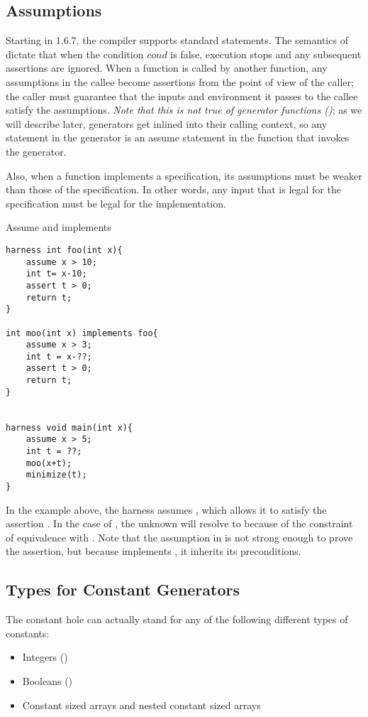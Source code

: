 \subsection{Assumptions}
Starting in \Sk{} 1.6.7, the compiler supports standard  statements. The semantics of  dictate that when the condition $cond$ is false, execution stops and any subsequent assertions are ignored. When a function is called by another function, any assumptions in the callee become assertions from the point of view of the caller; \ie{} the caller must guarantee that the inputs and environment it passes to the callee satisfy the assumptions. \emph{Note that this is not true of generator functions ()}; as we will describe later, generators get inlined into their calling context, so any  statement in the generator is an assume statement in the function that invokes the generator.

Also, when a function implements a specification, its assumptions must be weaker than those of the specification. In other words, any input that is legal for the specification must be legal for the implementation. 

\begin{Example}{Assume and implements}
\begin{lstlisting}
harness int foo(int x){
	assume x > 10;
	int t= x-10;
	assert t > 0;
	return t;
}

int moo(int x) implements foo{
	assume x > 3;
	int t = x-??;
	assert t > 0;
	return t;
}


harness void main(int x){
	assume x > 5;
	int t = ??;
	moo(x+t);
	minimize(t);
}
\end{lstlisting}
In the example above, the harness  assumes , which allows it to satisfy the assertion . In the case of , the unknown will resolve to  because of the constraint of equivalence with . Note that the assumption in  is not strong enough to prove the assertion, but because  implements , it inherits its preconditions. 
\end{Example}


\subsection{Types for Constant Generators}
The constant hole  can actually stand for any of the following different types of constants: 
\begin{itemize}
	\item Integers ()
	\item Booleans ()
	\item Constant sized arrays and nested constant sized arrays
\end{itemize}

